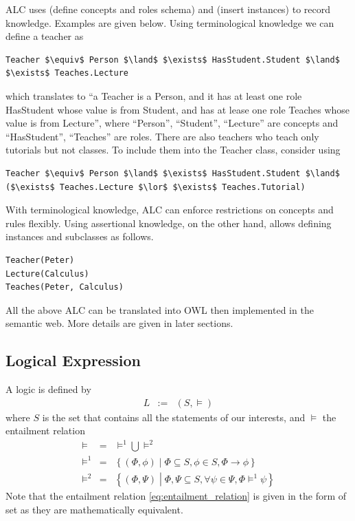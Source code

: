 ALC uses  (define concepts and roles schema) and  (insert instances) to record knowledge. Examples are given below. Using terminological knowledge we can define a teacher as
\begin{lstlisting}[mathescape=true]
Teacher $\equiv$ Person $\land$ $\exists$ HasStudent.Student $\land$ $\exists$ Teaches.Lecture
\end{lstlisting}
which translates to ``a Teacher is a Person, and it has at least one role HasStudent whose value is from Student, and has at lease one role Teaches whose value is from Lecture'', where ``Person'', ``Student'', ``Lecture'' are concepts and ``HasStudent'', ``Teaches'' are roles. There are also teachers who teach only tutorials but not classes. To include them into the Teacher class, consider using
\begin{lstlisting}[mathescape=true]
Teacher $\equiv$ Person $\land$ $\exists$ HasStudent.Student $\land$ ($\exists$ Teaches.Lecture $\lor$ $\exists$ Teaches.Tutorial)
\end{lstlisting}
With terminological knowledge, ALC can enforce restrictions on concepts and rules flexibly. Using assertional knowledge, on the other hand, allows defining instances and subclasses as follows.
\begin{lstlisting}
Teacher(Peter)
Lecture(Calculus)
Teaches(Peter, Calculus)
\end{lstlisting}

All the above ALC can be translated into OWL then implemented in the semantic web. More details are given in later sections.

\subsection{Logical Expression} \label{sec:logical_expression}

A logic is defined by 
\begin{eqnarray}
	L &:=& (S, \models) \label{eq:logic}
\end{eqnarray}
where $S$ is the set that contains all the statements of our interests, and $\models$ the entailment relation
\begin{eqnarray}
	\models &=& \models^1 \bigcup \models^2 \label{eq:entailment_relation} \\
	\models^1 &=& \left\{(\Phi,\phi)\middle| \Phi \subseteq S, \phi\in S, \Phi\rightarrow \phi\right\} \label{eq:logicentailment} \\
	\models^2 &=& \left\{(\Phi, \Psi)\middle| \Phi, \Psi \subseteq S, \forall \psi \in \Psi, \Phi \models^1 \psi \right\} \label{eq:compoundlogicentailment}
\end{eqnarray}
Note that the entailment relation \eqref{eq:entailment_relation} is given in the form of set as they are mathematically equivalent. 

